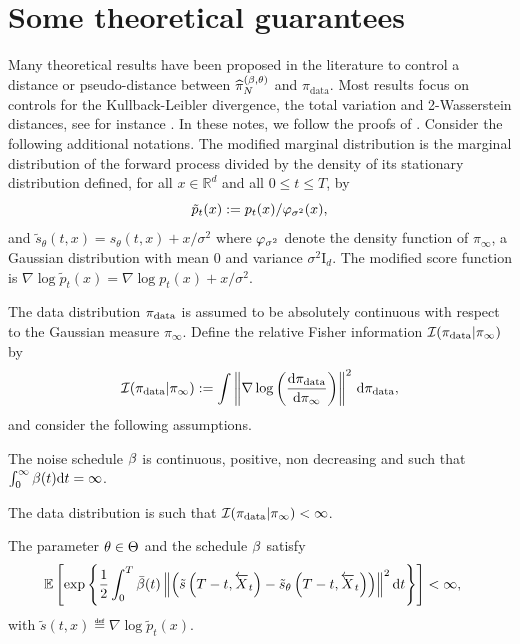 \documentclass[english,graybox,envcountchap,envcountsame,sectrefs,shortlabels]{svmono}
\theoremstyle{style}
\newcommand{\eqsp}{}
\begin{document}
\section{Some theoretical guarantees}
Many theoretical results have been proposed in the literature to control a distance or pseudo-distance between $\widehat{\pi}_N^{(\beta,\theta)}$ and $\pi_{\mathrm{data}}$. Most results focus on controls for the Kullback-Leibler divergence, the total variation and 2-Wasserstein distances, see for instance \cite{debortoli2021, conforti2023, chen2023sampling}. In these notes, we follow the proofs of \cite{strasman2024analysis}. Consider the following additional notations. The modified marginal distribution is the marginal distribution of the forward process divided by the density of its stationary distribution defined, for all $x\in\mathbb{R}^d$ and all $0\leqslant t \leqslant T$, by
$$
\tilde p_{t}(x) \eqdef {p_t(x)} / {\gausspdf_{\sigma^2}(x)}\eqsp, 
$$
and $ \tilde s_{\theta} (t, x) = s_{\theta}(t, x) + x/\sigma^2$ where $\varphi_{\sigma^2}$ denote the density function of $\pi_\infty$, a Gaussian distribution with mean $0$ and variance $\sigma^2 \mathrm{I}_d$. The modified score function is $\nabla \log \tilde p_t(x)= \nabla \log p_t(x) + x/\sigma^2$.

The data distribution $\pi_{\rm data}$ is assumed to be absolutely continuous with respect to the Gaussian measure $\pi_{\infty}$. Define the relative Fisher information $\mathcal{I}(\pi_{\rm data} | \pi_{\infty})$ by 
\begin{align*}
\mathcal{I}(\pi_{\rm data} | \pi_{\infty}) \eqdef
\int \left\| \nabla \log \left( \frac{\rmd \pi_{\rm data}}{\rmd \pi_{\infty}} \right) \right\|^2 \, \rmd \pi_{\rm data}\eqsp, 
\end{align*}
and consider the following assumptions.

\begin{hypH}
\label{hyp:sched}
    The noise schedule $\beta$ is continuous, positive, non decreasing and such that $\int_0^\infty \beta(t)\mathrm{d} t = \infty$.
\end{hypH}

\begin{hypH}
\label{hyp:fisher_info}
    The data distribution is such that $\mathcal{I}(\pi_{\rm data} | \pi_{\infty})<\infty$.
\end{hypH}


\begin{hypH}
\label{hyp:novikov}
The parameter $\theta\in\Theta$ and the schedule $\beta$ satisfy
    \begin{align*}
    \mathbb{E}\left[
        \exp\left\{
            \frac{1}{2} \int_0^T \bar \sched (t)
                \left\|  \left(  \tilde s\left(T-t,\ola X_t\right)   -\tilde s_{\param} \left( T-t, \ola{X}_{t}    \right) \right)  \right\|^2  \rmd t\right\}\right]&<\infty\eqsp,
    \end{align*}
    with 
    $\tilde s(t,x)\!\eqdef\! \nabla \log \tilde p_{t}(x)$.
\end{hypH}
\end{document}
